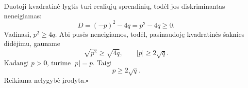 \documentclass[11pt,a4paper]{article}
\newcommand{\qed}{\hfill$\square$}
\begin{document}
Duotoji kvadratinė lygtis turi realiųjų sprendinių, todėl jos diskriminantas neneigiamas:
\[
D=(-p)^2-4q=p^2-4q\ge0.
\]
Vadinasi, $p^2\ge4q$. Abi pusės neneigiamos, todėl, pasinaudoję kvadratinės šaknies didėjimu, gauname
\[
\sqrt{p^2}\ge\sqrt{4q},\qquad |p|\ge2\sqrt q.
\]
Kadangi $p>0$, turime $|p|=p$. Taigi
\[
\boxed{p\ge2\sqrt q.}
\]
Reikiama nelygybė įrodyta.\qed
\end{document}

